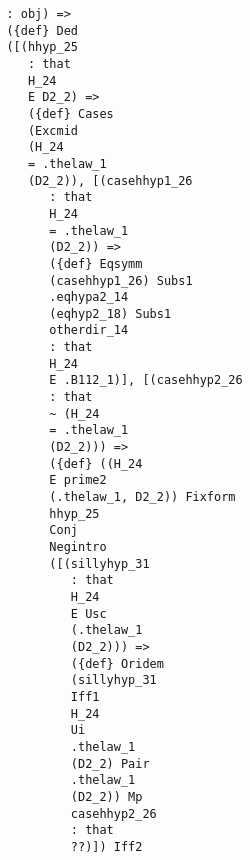 \documentclass[12pt]{article}
\begin{document}
\begin{verbatim}
                                  : obj) => 
                                  ({def} Ded 
                                  ([(hhyp_25 
                                     : that 
                                     H_24 
                                     E D2_2) => 
                                     ({def} Cases 
                                     (Excmid 
                                     (H_24 
                                     = .thelaw_1 
                                     (D2_2)), [(casehhyp1_26 
                                        : that 
                                        H_24 
                                        = .thelaw_1 
                                        (D2_2)) => 
                                        ({def} Eqsymm 
                                        (casehhyp1_26) Subs1 
                                        .eqhypa2_14 
                                        (eqhyp2_18) Subs1 
                                        otherdir_14 
                                        : that 
                                        H_24 
                                        E .B112_1)], [(casehhyp2_26 
                                        : that 
                                        ~ (H_24 
                                        = .thelaw_1 
                                        (D2_2))) => 
                                        ({def} ((H_24 
                                        E prime2 
                                        (.thelaw_1, D2_2)) Fixform 
                                        hhyp_25 
                                        Conj 
                                        Negintro 
                                        ([(sillyhyp_31 
                                           : that 
                                           H_24 
                                           E Usc 
                                           (.thelaw_1 
                                           (D2_2))) => 
                                           ({def} Oridem 
                                           (sillyhyp_31 
                                           Iff1 
                                           H_24 
                                           Ui 
                                           .thelaw_1 
                                           (D2_2) Pair 
                                           .thelaw_1 
                                           (D2_2)) Mp 
                                           casehhyp2_26 
                                           : that 
                                           ??)]) Iff2 

\end{verbatim}
\end{document}
